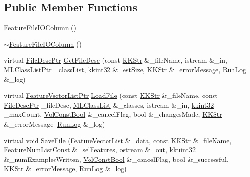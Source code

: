 \subsection*{Public Member Functions}
\begin{DoxyCompactItemize}
\item 
\hyperlink{class_k_k_m_l_l_1_1_feature_file_i_o_column_a0dfa4260d0338abd417efc09b8c719c3}{Feature\+File\+I\+O\+Column} ()
\item 
\hyperlink{class_k_k_m_l_l_1_1_feature_file_i_o_column_a3eaf1c6b7b4b607d23f6b12370f0c719}{$\sim$\+Feature\+File\+I\+O\+Column} ()
\item 
virtual \hyperlink{namespace_k_k_m_l_l_aa0d0b6ab4ec18868a399b8455b05d914}{File\+Desc\+Ptr} \hyperlink{class_k_k_m_l_l_1_1_feature_file_i_o_column_a944f29afcf4a7aeb04eed0a63eaff995}{Get\+File\+Desc} (const \hyperlink{class_k_k_b_1_1_k_k_str}{K\+K\+Str} \&\+\_\+file\+Name, istream \&\+\_\+in, \hyperlink{namespace_k_k_m_l_l_af091cde3f4a4315658b41a5e7583fc26}{M\+L\+Class\+List\+Ptr} \+\_\+class\+List, \hyperlink{namespace_k_k_b_a8fa4952cc84fda1de4bec1fbdd8d5b1b}{kkint32} \&\+\_\+est\+Size, \hyperlink{class_k_k_b_1_1_k_k_str}{K\+K\+Str} \&\+\_\+error\+Message, \hyperlink{class_k_k_b_1_1_run_log}{Run\+Log} \&\+\_\+log)
\item 
virtual \hyperlink{namespace_k_k_m_l_l_acf2ba92a3cf03e2b19674b24ff488ef6}{Feature\+Vector\+List\+Ptr} \hyperlink{class_k_k_m_l_l_1_1_feature_file_i_o_column_ae60b12143b480db4c365aa74dcc2aa08}{Load\+File} (const \hyperlink{class_k_k_b_1_1_k_k_str}{K\+K\+Str} \&\+\_\+file\+Name, const \hyperlink{namespace_k_k_m_l_l_aa0d0b6ab4ec18868a399b8455b05d914}{File\+Desc\+Ptr} \+\_\+file\+Desc, \hyperlink{class_k_k_m_l_l_1_1_m_l_class_list}{M\+L\+Class\+List} \&\+\_\+classes, istream \&\+\_\+in, \hyperlink{namespace_k_k_b_a8fa4952cc84fda1de4bec1fbdd8d5b1b}{kkint32} \+\_\+max\+Count, \hyperlink{namespace_k_k_b_a7d390f568e2831fb76b86b56c87bf92f}{Vol\+Const\+Bool} \&\+\_\+cancel\+Flag, bool \&\+\_\+changes\+Made, \hyperlink{class_k_k_b_1_1_k_k_str}{K\+K\+Str} \&\+\_\+error\+Message, \hyperlink{class_k_k_b_1_1_run_log}{Run\+Log} \&\+\_\+log)
\item 
virtual void \hyperlink{class_k_k_m_l_l_1_1_feature_file_i_o_column_a85931981577246071102aa45c059cf40}{Save\+File} (\hyperlink{class_k_k_m_l_l_1_1_feature_vector_list}{Feature\+Vector\+List} \&\+\_\+data, const \hyperlink{class_k_k_b_1_1_k_k_str}{K\+K\+Str} \&\+\_\+file\+Name, \hyperlink{namespace_k_k_m_l_l_ad276a9ed309552a63300bce930bdfebd}{Feature\+Num\+List\+Const} \&\+\_\+sel\+Features, ostream \&\+\_\+out, \hyperlink{namespace_k_k_b_af8d832f05c54994a1cce25bd5743e19a}{kkuint32} \&\+\_\+num\+Examples\+Written, \hyperlink{namespace_k_k_b_a7d390f568e2831fb76b86b56c87bf92f}{Vol\+Const\+Bool} \&\+\_\+cancel\+Flag, bool \&\+\_\+successful, \hyperlink{class_k_k_b_1_1_k_k_str}{K\+K\+Str} \&\+\_\+error\+Message, \hyperlink{class_k_k_b_1_1_run_log}{Run\+Log} \&\+\_\+log)
\end{DoxyCompactItemize}
